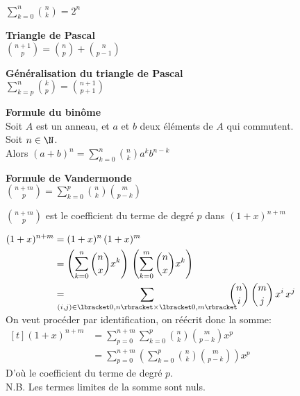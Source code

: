 \documentclass[12pt,twoside,a4paper]{article}
\author{MPSI 2}
\begin{document}
	\maketitle
	\begin{prop}
		$\sum\limits_{k=0}^{n}\binom{n}{k}=2^{n}$
	\end{prop}
	\begin{prop}
		\textbf{Triangle de Pascal}\\
		$\binom{n+1}{p}=\binom{n}{p}+\binom{n}{p-1}$
	\end{prop}
	\begin{prop}
		\textbf{G\'en\'eralisation du triangle de Pascal}\\
		$\sum\limits_{k=p}^{n}\binom{k}{p}=\binom{n+1}{p+1}$
	\end{prop}
	\begin{prop}
		\textbf{Formule du bin\^ome}\\
		Soit $A$ est un anneau, et $a$ et $b$ deux \'el\'ements de $A$ qui commutent.\\
		Soit $n\in\N$.\\
		Alors $(a+b)^{n}=\sum\limits^{n}_{k=0}\binom{n}{k}a^{k}b^{n-k}$
	\end{prop}
\newpage
	\begin{prop}
		\textbf{Formule de Vandermonde}\\
		$\binom{n+m}{p}=\sum\limits^{p}_{k=0}\binom{n}{k}\binom{m}{p-k}$
	\end{prop}
	\begin{preuve}
		\begin{liste}
			\item $\binom{n+m}{p}$ est le coefficient du terme de degr\'e $p$ dans $(1+x)^{n+m}$
			\item $\begin{aligned}[t]
				(1+x)^{n+m} & = (1+x)^{n}\,(1+x)^{m}\\
				& = \left(\sum\limits_{k=0}^{n}\binom{n}{x}x^{k} \right)\,\left(\sum\limits_{k=0}^{m}\binom{n}{x}x^{k} \right)\\
				& = \!\!\!\!\!\!\sum\limits_{(i,j)\in \lbracket 0,n\rbracket\times \lbracket 0,m\rbracket}\!\!\!\!\!\! \binom{n}{i}\,\binom{m}{j}\,x^{i}\,x^{j}
			\end{aligned}$\\
			On veut proc\'eder par identification, on r\'e\'ecrit donc la somme:\\
			$\begin{aligned}[t]
				(1+x)^{n+m} & =\sum\limits_{p=0}^{n+m}\sum\limits^{p}_{k=0}\binom{n}{k}\binom{m}{p-k} x^{p}\\
				& = \sum\limits_{p=0}^{n+m} \left( \sum\limits^{p}_{k=0}\binom{n}{k}\binom{m}{p-k}\right)  x^{p}
			\end{aligned}$\\
			D'o\`u le coefficient du terme de degr\'e $p$.\\
			N.B. Les termes limites de la somme sont nuls.
		\end{liste}
	\end{preuve}
\end{document}
